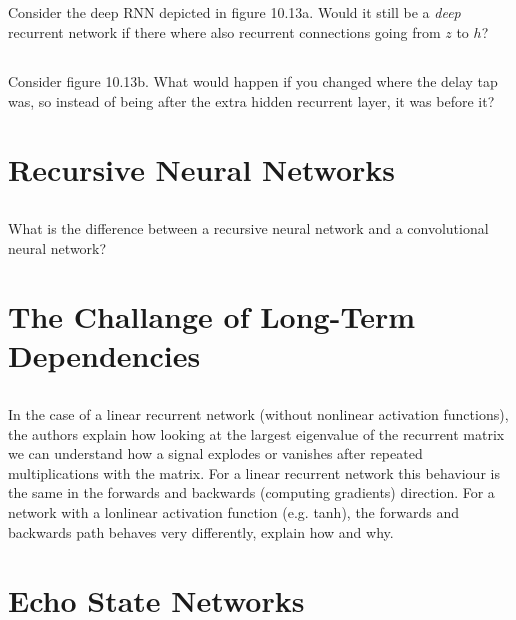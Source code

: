\documentclass[a4paper]{report}
\begin{document}
    \subsection{}
    Consider the deep RNN depicted in figure 10.13a. Would it still be a \emph{deep} recurrent network if there where also recurrent connections going from $z$ to $h$?
    \subsection{}
    Consider figure 10.13b. What would happen if you changed where the delay tap was, so instead of being after the extra hidden recurrent layer, it was before it?

    \section{Recursive Neural Networks}
    \subsection{}
    What is the difference between a recursive neural network and a convolutional neural network?

    \section{The Challange of Long-Term Dependencies}
    \subsection{}
    In the case of a linear recurrent network (without nonlinear activation functions), the authors explain how looking at the largest eigenvalue of the recurrent matrix we can understand how a signal explodes or vanishes after repeated multiplications with the matrix. For a linear recurrent network this behaviour is the same in the forwards and backwards (computing gradients) direction. For a network with a lonlinear activation function (e.g. tanh), the forwards and backwards path behaves very differently, explain how and why.

    \section{Echo State Networks}
\end{document}
